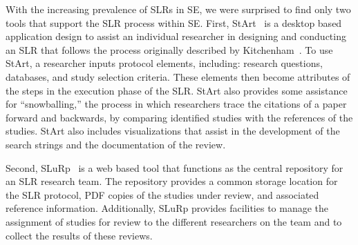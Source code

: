 With the increasing prevalence of SLRs in SE, we were surprised to find only two tools that support the SLR process within SE. First, StArt~\cite{Fabbri_et_al_2012} is a desktop based application design to assist an individual researcher in designing and conducting an SLR that follows the process originally described by Kitchenham~\cite{Kitchenham:04}. To use StArt, a researcher inputs protocol elements, including: research questions, databases, and study selection criteria. These elements then become attributes of the steps in the execution phase of the SLR. StArt also provides some assistance for ``snowballing,'' the process in which researchers trace the citations of a paper forward and backwards, by comparing identified studies with the references of the studies. StArt also includes visualizations that assist in the development of the search strings and the documentation of the review.

Second, SLuRp~\cite{Bowes_et_al_2012} is a web based tool that functions as the central repository for an SLR research team. The repository provides a common storage location for the SLR protocol, PDF copies of the studies under review, and associated reference information. Additionally, SLuRp provides facilities to manage the assignment of studies for review to the different researchers on the team and to collect the results of these reviews.


